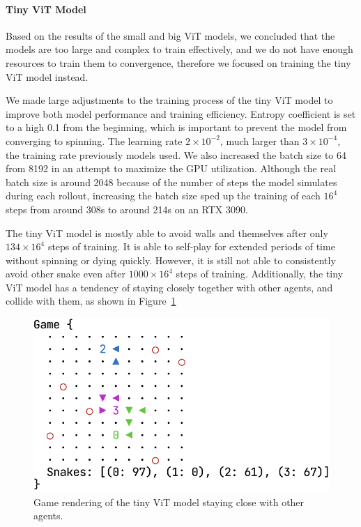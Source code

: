 \documentclass[conference]{IEEEtran}
\begin{document}
\paragraph{Tiny ViT Model}
Based on the results of the small and big ViT models,
we concluded that the models are too large and complex to train effectively,
and we do not have enough resources to train them to convergence,
therefore we focused on training the tiny ViT model instead.

We made large adjustments to the training process of the tiny ViT model to
improve both model performance and training efficiency.
Entropy coefficient is set to a high 0.1 from the beginning,
which is important to prevent the model from converging to spinning.
The learning rate $2\times 10^{-2}$, much larger than $3\times 10^{-4}$,
the training rate previously models used.
We also increased the batch size to 64 from 8192 in an attempt to maximize the
GPU utilization.
Although the real batch size is around 2048 because of the number of steps the
model simulates during each rollout,
increasing the batch size sped up the training of each $16^4$ steps from around
308s to around 214s on an RTX 3090.

The tiny ViT model is mostly able to avoid walls and themselves after only
$134\times 16^4$ steps of training.
It is able to self-play for extended periods of time without spinning or dying
quickly. However,
it is still not able to consistently avoid other snake even after $1000\times
    16^4$ steps of training. Additionally,
the tiny ViT model has a tendency of staying closely together with other agents,
and collide with them, as shown in Figure~\ref{fig:tiny-vit-close-render}

\begin{figure}
    \centering
    \includegraphics[width=\linewidth]{tiny_vit_close_render.png}
    \caption{Game rendering of the tiny ViT model staying close with other
        agents.
    }
    \label{fig:tiny-vit-close-render}
\end{figure}
\end{document}
